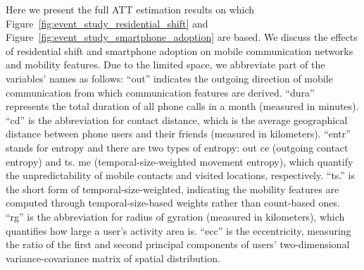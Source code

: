 
\label{complete_event_study_callaway}

Here we present the full ATT estimation results on which Figure~\ref{fig:event_study_residential_shift} and Figure~\ref{fig:event_study_smartphone_adoption} are based. We discuss the effects of residential shift and smartphone adoption on mobile communication networks and mobility features. Due to the limited space, we abbreviate part of the variables' names as follows: ``out'' indicates the outgoing direction of mobile communication from which communication features are derived. ``dura'' represents the total duration of all phone calls in a month (measured in minutes). ``cd'' is the abbreviation for contact distance, which is the average geographical distance between phone users and their friends (measured in kilometers). ``entr'' stands for entropy and there are two types of entropy: out ce (outgoing contact entropy) and ts. me (temporal-size-weighted movement entropy), which quantify the unpredictability of mobile contacts and visited locations, respectively. ``ts.'' is the short form of temporal-size-weighted, indicating the mobility features are computed through temporal-size-based weights rather than count-based ones. ``rg'' is the abbreviation for radius of gyration (measured in kilometers), which quantifies how large a user's activity area is. ``ecc'' is the eccentricity, measuring the ratio of the first and second principal components of users' two-dimensional variance-covariance matrix of spatial distribution.

